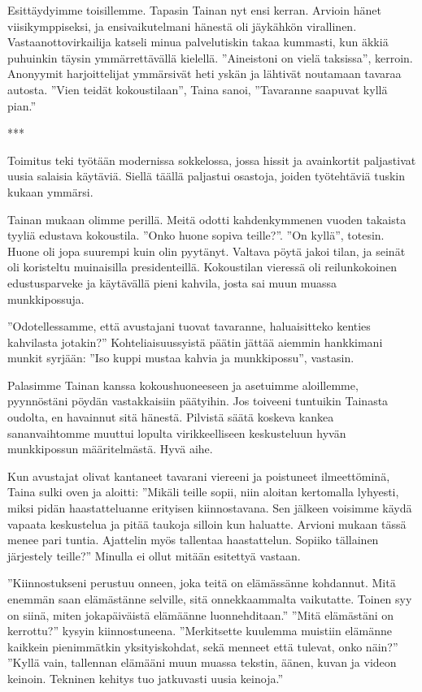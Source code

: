 ﻿\documentclass[a4paper, 12pt, finnish]{article}
\newcommand{\q}[1]{''#1''}  %
\begin{document}
Esittäydyimme toisillemme. Tapasin Tainan nyt ensi kerran. Arvioin hänet viisikymppiseksi, ja ensivaikutelmani hänestä oli jäykähkön virallinen.
Vastaanottovirkailija katseli minua palvelutiskin takaa kummasti,
kun äkkiä puhuinkin täysin ymmärrettävällä kielellä.
\q{Aineistoni on vielä taksissa}, kerroin. Anonyymit harjoittelijat ymmärsivät
heti yskän ja lähtivät noutamaan tavaraa autosta.
\q{Vien teidät kokoustilaan}, Taina sanoi, \q{Tavaranne saapuvat kyllä pian.}

***

Toimitus teki työtään modernissa sokkelossa, jossa hissit ja
avainkortit paljastivat uusia salaisia käytäviä. Siellä täällä
paljastui osastoja, joiden työtehtäviä tuskin kukaan ymmärsi.

Tainan mukaan olimme perillä. Meitä odotti kahdenkymmenen vuoden
takaista tyyliä edustava kokoustila. \q{Onko huone sopiva teille?}.
\q{On kyllä}, totesin. Huone oli jopa suurempi kuin olin pyytänyt.
Valtava pöytä jakoi tilan, ja seinät oli koristeltu muinaisilla
presidenteillä. Kokoustilan vieressä oli reilunkokoinen
edustusparveke ja käytävällä pieni kahvila, josta sai muun
muassa munkkipossuja.

\q{Odotellessamme, että avustajani tuovat tavaranne,
haluaisitteko kenties kahvilasta jotakin?} Kohteliaisuussyistä päätin
jättää aiemmin hankkimani munkit syrjään: \q{Iso kuppi mustaa kahvia
ja munkkipossu}, vastasin.

Palasimme Tainan kanssa kokoushuoneeseen ja asetuimme aloillemme,
pyynnöstäni pöydän vastakkaisiin päätyihin.
Jos toiveeni tuntuikin Tainasta oudolta, en havainnut sitä hänestä.
Pilvistä säätä koskeva kankea sananvaihtomme muuttui lopulta
virikkeelliseen keskusteluun hyvän munkkipossun määritelmästä.
Hyvä aihe.

Kun avustajat olivat kantaneet tavarani viereeni ja poistuneet
ilmeettöminä, Taina sulki oven ja aloitti:
\q{Mikäli teille sopii, niin aloitan kertomalla lyhyesti,
miksi pidän haastatteluanne erityisen kiinnostavana. Sen jälkeen
voisimme käydä vapaata keskustelua ja pitää taukoja silloin kun haluatte.
Arvioni mukaan tässä menee pari tuntia. Ajattelin myös tallentaa
haastattelun. Sopiiko tällainen järjestely teille?}
Minulla ei ollut mitään esitettyä vastaan.

\q{Kiinnostukseni perustuu onneen, joka teitä on elämässänne kohdannut.
Mitä enemmän saan elämästänne selville, sitä onnekkaammalta vaikutatte.
Toinen syy on siinä, miten jokapäiväistä elämäänne luonnehditaan.}
\q{Mitä elämästäni on kerrottu?} kysyin kiinnostuneena.
\q{Merkitsette kuulemma muistiin elämänne kaikkein pienimmätkin
yksityiskohdat, sekä menneet että tulevat, onko näin?}
\q{Kyllä vain, tallennan elämääni muun muassa tekstin, äänen,
kuvan ja videon keinoin. Tekninen kehitys tuo jatkuvasti
uusia keinoja.}
\end{document}
